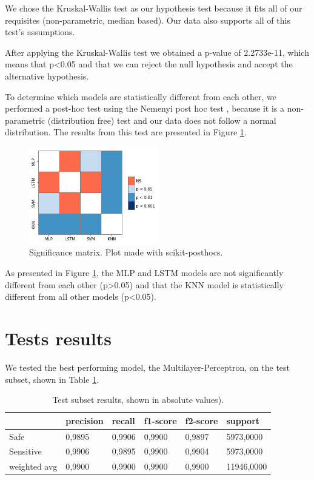 We chose the Kruskal-Wallis test \cite{kruskal1952use} as our hypothesis test because it fits all of our requisites (non-parametric, median based). Our data also supports all of this test's assumptions.

After applying the Kruskal-Wallis test we obtained a p-value of 2.2733e-11, which means that p<0.05 and that we can reject the null hypothesis and accept the alternative hypothesis.

To determine which models are statistically different from each other, we performed a post-hoc test using the Nemenyi post hoc test \cite{nemenyi1963distribution}, because it is a non-parametric (distribution free) test and our data does not follow a normal distribution. The results from this test are presented in Figure \ref{fig:significance-matrix}.

\begin{figure}[!ht]
    \centering
    \includegraphics[width=0.5\textwidth]{img/results/significance-matrix.png}
    \caption{Significance matrix. Plot made with scikit-posthocs\cite{Terpilowski2019}.}
    \label{fig:significance-matrix}
\end{figure}

As presented in Figure \ref{fig:significance-matrix}, the MLP and LSTM models are not significantly different from each other (p>0.05) and that the KNN model is statistically different from all other models (p<0.05).

\section{Tests results}\label{sec:tests}

We tested the best performing model, the Multilayer-Perceptron, on the test subset, shown in Table \ref{tab:test-general-results}. 

\begin{table}[!ht]
\centering
\caption{Test subset results, shown in absolute values).}
\begin{tabular}{l|l|l|l|l|l}
             & precision & recall & f1-score & f2-score & support                         \\ \hline
Safe         & 0,9895    & 0,9906 & 0,9900   & 0,9897   & 5973,0000                       \\ \hline
Sensitive    & 0,9906    & 0,9895 & 0,9900   & 0,9904   & 5973,0000                       \\ \hline
weighted avg & 0,9900    & 0,9900 & 0,9900   & 0,9900   & \multicolumn{1}{l}{11946,0000}
\end{tabular}
\label{tab:test-general-results}
\end{table}

